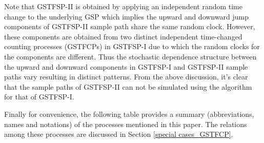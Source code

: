 \documentclass[11pt,oneside,reqno]{amsart}
\theoremstyle{definition}
\theoremstyle{remarkstyle}
\begin{document}
Note that GSTFSP-II is obtained by applying an independent random time change to the underlying GSP which implies the upward and downward jump components of GSTFSP-II sample path share the same random clock. However, these components are obtained from two distinct independent time-changed counting processes (GSTFCPs) in GSTFSP-I due to which the random clocks for the components are different. Thus the stochastic dependence structure between the upward and downward components in GSTFSP-I and GSTFSP-II sample paths vary resulting in distinct patterns. From the above discussion, it's clear that the sample paths of GSTFSP-II can not be simulated using the algorithm for that of GSTFSP-I.

Finally for convenience, the following table provides a summary (abbreviations, names and notations) of the processes mentioned in this paper. The relations among these processes are discussed in Section \ref{special cases_GSTFCP}. 
\end{document}
